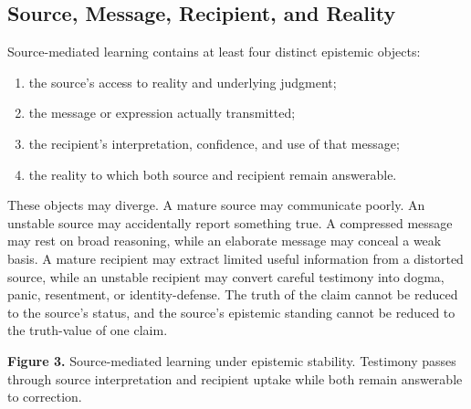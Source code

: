 \documentclass[11pt]{article}
\begin{document}
\subsection{Source, Message, Recipient, and Reality}

Source-mediated learning contains at least four distinct epistemic objects:

\begin{enumerate}[label=\arabic*.]
    \item the source's access to reality and underlying judgment;
    \item the message or expression actually transmitted;
    \item the recipient's interpretation, confidence, and use of that message;
    \item the reality to which both source and recipient remain answerable.
\end{enumerate}

These objects may diverge. A mature source may communicate poorly. An unstable source may accidentally report something true. A compressed message may rest on broad reasoning, while an elaborate message may conceal a weak basis. A mature recipient may extract limited useful information from a distorted source, while an unstable recipient may convert careful testimony into dogma, panic, resentment, or identity-defense. The truth of the claim cannot be reduced to the source's status, and the source's epistemic standing cannot be reduced to the truth-value of one claim.

\begin{center}
\par\smallskip
{\small\textbf{Figure 3.} Source-mediated learning under epistemic stability. Testimony passes through source interpretation and recipient uptake while both remain answerable to correction.}
\end{center}
\end{document}
